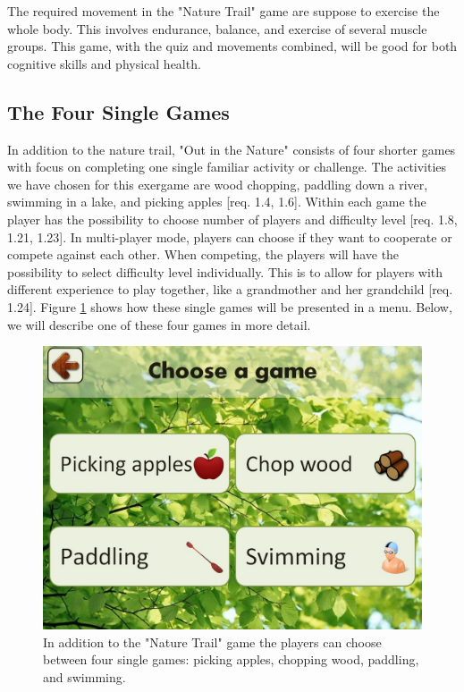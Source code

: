 The required movement in the "Nature Trail" game are suppose to exercise the whole body. This involves endurance, balance, and exercise of several muscle groups. This game, with the quiz and movements combined, will be good for both cognitive skills and physical health.     

\subsection{The Four Single Games}
In addition to the nature trail, "Out in the Nature" consists of four shorter games with focus on completing one single familiar activity or challenge. The activities we have chosen for this exergame are wood chopping, paddling down a river, swimming in a lake, and picking apples [req. 1.4, 1.6]. Within each game the player has the possibility to choose number of players and difficulty level [req. 1.8, 1.21, 1.23]. In multi-player mode, players can choose if they want to cooperate or compete against each other. When competing, the players will have the possibility to select difficulty level individually. This is to allow for players with different experience to play together, like a grandmother and her grandchild [req. 1.24]. Figure \ref{fig:velgSpill} shows how these single games will be presented in a menu. Below, we will describe one of these four games in more detail.

\begin{figure} [H]
\centering
\includegraphics[scale=0.25]{chooseGame.jpg}
\caption[The four single games]{In addition to the "Nature Trail" game the players can choose between four single games: picking apples, chopping wood, paddling, and swimming.}
\label{fig:velgSpill}
\end{figure}

